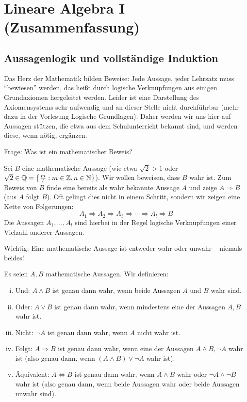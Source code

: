 \chapter{Lineare Algebra I (Zusammenfassung)} %
\label{cha:1}
\section{Aussagenlogik und vollständige Induktion}
\label{sec:1.1}
	Das Herz der Mathematik bilden Beweise:
	Jede Aussage, jeder Lehrsatz muss \enquote{bewiesen} werden, das heißt durch logische Verknüpfungen aus einigen Grundaxiomen hergeleitet werden.
	Leider ist eine Darstellung des Axiomensystems sehr aufwendig und an dieser Stelle nicht durchführbar (mehr dazu in der Vorlesung Logische Grundlagen).
	Daher werden wir uns hier auf Aussagen stützen, die etwa aus dem Schulunterricht bekannt sind, und werden diese, wenn nötig, ergänzen.
	
	Frage: Was ist ein mathematischer Beweis?
	
	Sei $B$ eine mathematische Aussage (wie etwa $\sqrt{2} > 1$ oder $\sqrt{2} \in \mathbb{Q} = \left\{\frac{m}{l} : m \in \mathbb{Z}, n \in \mathbb{N}\right\}$).
	Wir wollen beweisen, dass $B$ wahr ist.
	Zum Beweis von $B$ finde eine bereits als wahr bekannte Aussage $A$ und zeige $A \Rightarrow B$ (aus $A$ folgt $B$).
	Oft gelingt dies nicht in einem Schritt, sondern wir zeigen eine Kette von Folgerungen:
	\[
		A_1 \Rightarrow A_2 \Rightarrow A_3 \Rightarrow \cdots \Rightarrow A_l \Rightarrow B
	\]
	Die Aussagen $A_1,\dots,A_l$ sind hierbei in der Regel logische Verknüpfungen einer Vielzahl anderer Aussagen.
	
	Wichtig: Eine mathematische Aussage ist entweder wahr oder unwahr -- niemals beides!
	
\begin{definition}
	\label{def:I.1.1}
	Es seien $A,B$ mathematische Aussagen. 
	Wir definieren:
	\begin{enumerate}[(i)]
		\item Und: $A \wedge B$ ist genau dann wahr, wenn beide Aussagen $A$ und $B$ wahr sind.
		\item Oder: $A \vee B$ ist genau dann wahr, wenn mindestens eine der Aussagen $A,B$ wahr ist.
		\item Nicht: $\neg A$ ist genau dann wahr, wenn $A$ nicht wahr ist.
		\item Folgt: $A \Rightarrow B$ ist genau dann wahr, wenn eine der Aussagen $A \wedge B, \neg A$ wahr ist (also genau dann, wenn $(A \wedge B) \vee \neg A$ wahr ist).
		\item Äquivalent: $A \Leftrightarrow B$ ist genau dann wahr, wenn $A \wedge B$ wahr oder $\neg A \wedge \neg B$ wahr ist (also genau dann, wenn beide Aussagen wahr oder beide Aussagen unwahr sind).
	\end{enumerate}
\end{definition}

